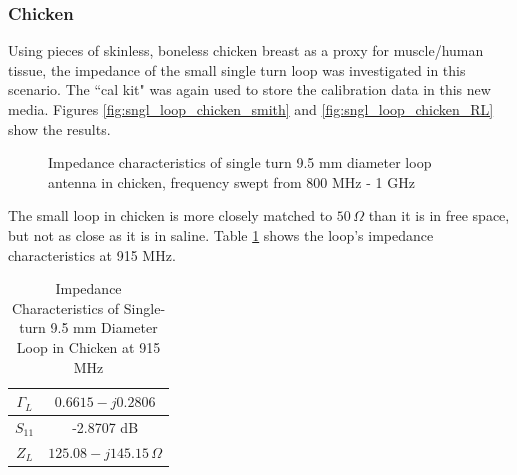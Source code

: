 \documentclass[12pt,onecolumn,titlepage]{article}
\begin{document}
\subsubsection{Chicken}
\indent \indent Using pieces of skinless, boneless chicken breast as a proxy for muscle/human tissue, the impedance of the small single turn loop was investigated in this scenario. The ``cal kit" was again used to store the calibration data in this new media. Figures \ref{fig:sngl_loop_chicken_smith} and \ref{fig:sngl_loop_chicken_RL} show the results.


\begin{figure}[htbp]
	\centering
		\quad
	\label{fig:sngle_loop_chicken}
	\caption{Impedance characteristics of single turn 9.5 mm diameter loop antenna in chicken, frequency swept from 800 MHz - 1 GHz}
\end{figure}

The small loop in chicken is more closely matched to $50 \, \Omega$ than it is in free space, but not as close as it is in saline. Table \ref{tab:sngl_loop_chicken} shows the loop's impedance characteristics at 915 MHz.


\begin{table}[h]
\centering
	\caption{Impedance Characteristics of Single-turn 9.5 mm Diameter Loop in Chicken at 915 MHz}
	\begin{tabular}{| c || c |}
	\hline
	$\Gamma_L$ & $0.6615-j0.2806$ \\ \hline
	$S_{11}$ & -2.8707 dB \\ \hline
	$Z_L$ & $125.08-j145.15 \, \Omega$ \\ \hline
	\end{tabular}
\label{tab:sngl_loop_chicken}
\end{table}
\end{document}
